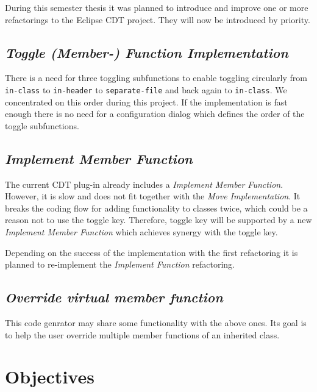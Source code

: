 During this semester thesis it was planned to introduce and improve one or more
refactorings to the Eclipse CDT project. They will now be introduced by 
priority.

\subsection{\textit{Toggle (Member-) Function Implementation}}
There is a need for three toggling subfunctions to enable toggling circularly
from \texttt{in-class}
to \texttt{in-header} to \texttt{separate-file}  and back again to
\texttt{in-class}. We concentrated on this order during this project. If the
implementation is fast enough there is no need for a configuration dialog which
defines the order of the toggle subfunctions.

\subsection{\textit{Implement Member Function}}
The current CDT plug-in already includes a \textit{Implement Member Function}.
However, it is slow and does not fit together with the \textit{Move
Implementation}. It breaks the coding flow for adding functionality to classes
twice, which could be a reason not to use the toggle key. Therefore, toggle key
will be supported by a new \textit{Implement Member Function} which achieves
synergy with the toggle key.

Depending on the success of the implementation with the first refactoring it is 
planned to re-implement the \textit{Implement Function} refactoring.

\subsection{\textit{Override virtual member function}}
This code genrator may share some functionality with the above ones. Its goal is 
to help the user override multiple member functions of an inherited class.

\section{Objectives}

